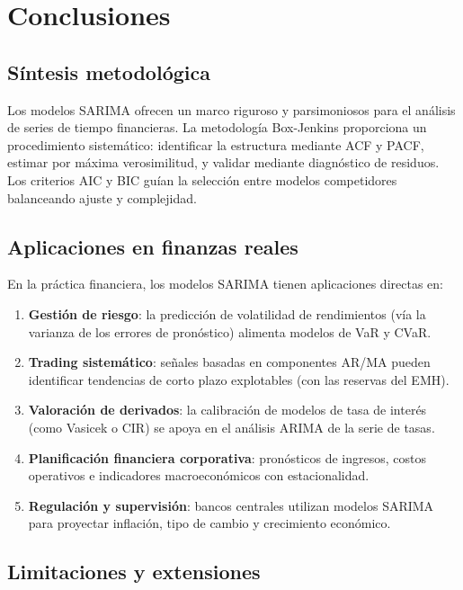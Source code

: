 \documentclass[12pt,a4paper]{article}
\begin{document}
\section{Conclusiones}

\subsection{Síntesis metodológica}

Los modelos SARIMA ofrecen un marco riguroso y parsimoniosos para el análisis de series de
tiempo financieras. La metodología Box-Jenkins proporciona un procedimiento sistemático:
identificar la estructura mediante ACF y PACF, estimar por máxima verosimilitud, y validar
mediante diagnóstico de residuos. Los criterios AIC y BIC guían la selección entre modelos
competidores balanceando ajuste y complejidad.

\subsection{Aplicaciones en finanzas reales}

En la práctica financiera, los modelos SARIMA tienen aplicaciones directas en:

\begin{enumerate}
  \item \textbf{Gestión de riesgo}: la predicción de volatilidad de rendimientos (vía la
        varianza de los errores de pronóstico) alimenta modelos de VaR y CVaR.
  \item \textbf{Trading sistemático}: señales basadas en componentes AR/MA pueden identificar
        tendencias de corto plazo explotables (con las reservas del EMH).
  \item \textbf{Valoración de derivados}: la calibración de modelos de tasa de interés
        (como Vasicek o CIR) se apoya en el análisis ARIMA de la serie de tasas.
  \item \textbf{Planificación financiera corporativa}: pronósticos de ingresos, costos
        operativos e indicadores macroeconómicos con estacionalidad.
  \item \textbf{Regulación y supervisión}: bancos centrales utilizan modelos SARIMA para
        proyectar inflación, tipo de cambio y crecimiento económico.
\end{enumerate}

\subsection{Limitaciones y extensiones}
\end{document}
